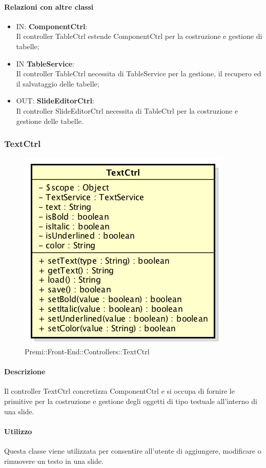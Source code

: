 	\paragraph{Relazioni con altre classi}
	\begin{itemize}
 	\item IN: \textbf{ComponentCtrl}:\\
	 	Il controller TableCtrl estende ComponentCtrl per la costruzione e gestione di tabelle;
	\item IN \textbf{TableService}:\\
		Il controller TableCtrl necessita di TableService per la gestione, il recupero ed il salvataggio delle tabelle;
	\item OUT: \textbf{SlideEditorCtrl}:\\
		Il controller SlideEditorCtrl necessita di TableCtrl per la costruzione e gestione delle tabelle. 	
	\end{itemize}

\newpage
\subsubsection{TextCtrl}
\begin{figure}[h]
	\centering
	\includegraphics[width=0.4\linewidth]{img/premi_front_end_controllers_textctrl}
	\caption[Premi::Front-End::Controllers::TextCtrl]{Premi::Front-End::Controllers::TextCtrl}
\end{figure}
   \paragraph{Descrizione}
	Il controller TextCtrl concretizza ComponentCtrl e si occupa di fornire le primitive per la costruzione e gestione degli oggetti di tipo testuale all'interno di una slide.
		
	\paragraph{Utilizzo}
	Questa classe viene utilizzata per consentire all'utente di aggiungere, modificare o rimuovere un testo in una slide.
	
